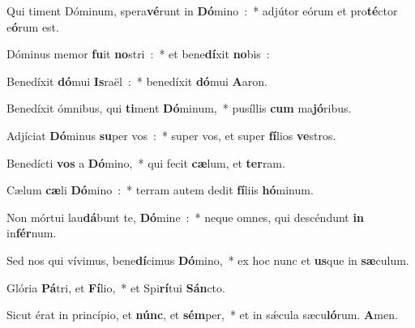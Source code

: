 \item Qui timent Dóminum, spera\textbf{vé}\-runt in \textbf{Dó}\-mino~:~* adjútor eórum et pro\textbf{té}\-ctor e\textbf{ó}\-rum est.
\item Dóminus memor \textbf{fu}\-it \textbf{no}\-stri~:~* et bene\textbf{dí}\-xit \textbf{no}bis~:
\item Benedíxit \textbf{dó}\-mui \textbf{Is}\-raël~:~* benedíxit \textbf{dó}\-mui \textbf{A}aron.
\item Benedíxit ómnibus, qui \textbf{ti}\-ment \textbf{Dó}\-minum,~* pu\-síl\-lis \textbf{cum} ma\textbf{jó}ribus.
\item Adjíciat \textbf{Dó}\-minus \textbf{su}\-per vos~:~* super vos, et super \textbf{fí}\-li\-os \textbf{ve}stros.
\item Benedícti \textbf{vos} a \textbf{Dó}\-mino,~* qui fecit \textbf{cæ}\-lum, et \textbf{ter}ram.
\item Cælum \textbf{cæ}\-li \textbf{Dó}\-mino~:~* terram autem dedit \textbf{fí}\-liis \textbf{hó}minum.
\item Non mórtui lau\textbf{dá}\-bunt te, \textbf{Dó}\-mine~:~* neque omnes, qui descéndunt \textbf{in} in\textbf{fér}num.
\item Sed nos qui vívimus, bene\textbf{dí}\-cimus \textbf{Dó}\-mino,~* ex hoc nunc et \textbf{us}\-que in \textbf{sæ}culum.
\item Glória \textbf{Pá}\-tri, et \textbf{Fí}\-lio,~* et Spi\textbf{rí}\-tui \textbf{Sán}cto.
\item Sicut érat in princípio, et \textbf{núnc}, et \textbf{sém}\-per,~* et in sǽ\-cu\-la sæcu\textbf{ló}\-rum. \textbf{A}men.
